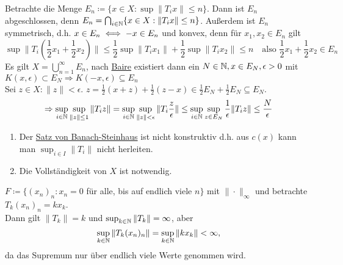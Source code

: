 \begin{beweis}
	Betrachte die Menge $E_{n} \coloneqq \{ x \in X: \sup \| T_{i} x \| \leq n\}$. Dann ist $E_{n}$ abgeschlossen, denn $E_{n} = \bigcap_{i \in \mathbb{N}} \{ x \in X: \| T_{i} x \| \leq n \}$. Außerdem ist $E_{n}$ symmetrisch, d.h. $x \in E_{n} \iff -x \in E_{n}$ und konvex, denn für $x_{1}, x_{2} \in E_{n}$ gilt
		\[ \sup \| T_{i} \left( \frac{1}{2} x_{1} + \frac{1}{2} x_{2} \right) \| \leq \frac{1}{2} \sup \| T_{i} x_{1} \| + \frac{1}{2} \sup \| T_{i} x_{2} \| \leq n \quad \text{also } \frac{1}{2} x_{1} + \frac{1}{2} x_{2} \in E_{n} \]
		Es gilt $X = \bigcup_{n = 1}^{\infty} E_{n}$, nach \hyperref[satz:9.1-baire]{Baire} existiert dann ein $N \in \mathbb{N}, x \in E_{N}, \epsilon > 0$ mit $K(x, \epsilon) \subset E_{N} \Rightarrow K(-x, \epsilon) \subseteq E_{n}$ \\
		Sei $z \in X: \| z \| < \epsilon$. $z = \frac{1}{2} (x + z) + \frac{1}{2} (z - x) \in \frac{1}{2} E_{N} + \frac{1}{2} E_{N} \subseteq E_{N}$. 
		\[ \Rightarrow \sup_{i \in \mathbb{N}} \sup_{\| z \| \leq 1} \| T_{i} z \| = \sup_{i \in \mathbb{N}} \sup_{\| z \| < \epsilon} \| T_{i} \frac{z}{\epsilon} \| \leq \sup_{i \in \mathbb{N}} \sup_{z \in E_{N}} \frac{1}{\epsilon} \| T_{i} z \| \leq \frac{N}{\epsilon} \]	
\end{beweis}


\begin{bemerkung}  \label{bem:9.6}
	\begin{enumerate}[label=\alph*\upshape)]
		\item Der \hyperref[satz:9.5-Banach-Steinhaus]{Satz von Banach-Steinhaus} ist nicht konstruktiv d.h. aus $c(x)$ kann man $\sup_{i \in I} \| T_{i} \|$ nicht herleiten.
		\item Die Vollständigkeit von $X$ ist notwendig.
	\end{enumerate}	
\end{bemerkung}


\begin{beispiel*}
$F \coloneqq \{ (x_{n})_{n}: x_{n} = 0$ für alle, bis auf endlich viele $n \}$ mit $\| \cdot \|_{\infty}$ und betrachte $T_{k} (x_{n})_{n} = k x_{k}$. \\ 
	Dann gilt $\| T_{k} \| = k$ und $\sup_{k \in \mathbb{N}} \| T_{k} \| = \infty$, aber 
	\[ \sup_{k \in \mathbb{N}} \| T_{k} (x_{n})_{n} \| = \sup_{k \in \mathbb{N}} \| k x_{k} \| < \infty, \]
	da das Supremum nur über endlich viele Werte genommen wird.
\end{beispiel*}


